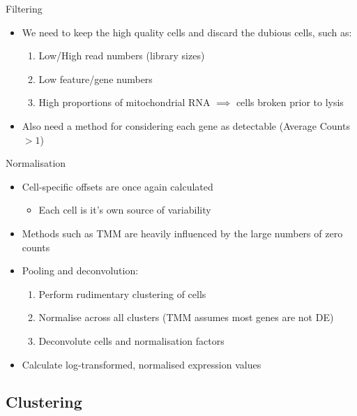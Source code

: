 \documentclass[aspectratio=169,11pt]{beamer}
\begin{document}
\begin{frame}{Filtering}

	\begin{itemize}
		\item We need to keep the high quality cells and discard the dubious cells, such as:\\[2mm]
		\begin{enumerate}
			\item Low/High read numbers (library sizes)
			\item Low feature/gene numbers
			\item High proportions of mitochondrial RNA $\implies$ cells broken prior to lysis\\[2mm]
		\end{enumerate}
		\pause
		\item Also need a method for considering each gene as detectable (Average Counts $>1$)
	\end{itemize}

\end{frame}


\begin{frame}{Normalisation}
	\begin{itemize}
		\item Cell-specific offsets are once again calculated
		\begin{itemize}
			\item Each cell is it's own source of variability
		\end{itemize}
		\item Methods such as TMM are heavily influenced by the large numbers of zero counts
		\item Pooling and deconvolution:
		\begin{enumerate}
			\item Perform rudimentary clustering of cells		
			\item Normalise across all clusters (TMM assumes most genes are not DE)
			\item Deconvolute cells and normalisation factors
		\end{enumerate}
		\item Calculate log-transformed, normalised expression values
	\end{itemize}
\end{frame}

\subsection{Clustering}
\end{document}
